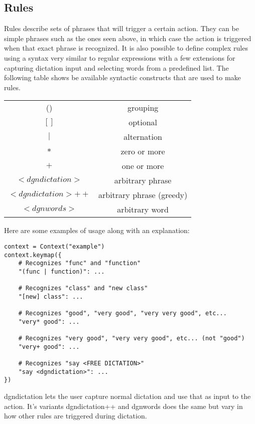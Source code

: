 \documentclass[a4paper,english]{ifimaster}
\begin{document}
\subsection{Rules}
Rules describe sets of phrases that will trigger a certain action.
They can be simple phrases such as the ones seen above, in which case the action is triggered when that exact phrase is recognized.
It is also possible to define complex rules using a syntax very similar to regular expressions with a few extensions for
capturing dictation input and selecting words from a predefined list.
The following table shows be available syntactic constructs that are used to make rules.
\begin{center}
\begin{tabular}{ c | c }
    () & grouping   \\
    $[]$ & optional   \\
    $\mid$ & alternation  \\
    $*$ & zero or more   \\
    $+$ & one or more     \\
    $<dgndictation>$&arbitrary phrase \\
    $<dgndictation>++$&arbitrary phrase (greedy) \\
    $<dgnwords>$&arbitrary word \\
\end{tabular}
\end{center}
Here are some examples of usage along with an explanation:
\begin{verbatim}
context = Context("example")
context.keymap({
    # Recognizes "func" and "function"
    "(func | function)": ...

    # Recognizes "class" and "new class"
    "[new] class": ...

    # Recognizes "good", "very good", "very very good", etc...
    "very* good": ...

    # Recognizes "very good", "very very good", etc... (not "good")
    "very+ good": ...

    # Recognizes "say <FREE DICTATION>"
    "say <dgndictation>": ...
})
\end{verbatim}
dgndictation lets the user capture normal dictation and use that as input to the action.
It's variants dgndictation++ and dgnwords does the same but vary in how other rules are triggered
during dictation.
\end{document}
